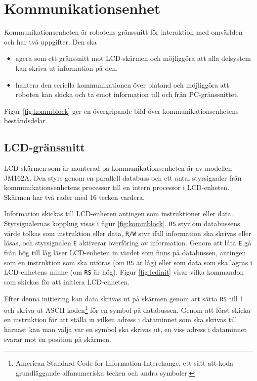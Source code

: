 \section{Kommunikationsenhet}
Kommunikationsenheten är robotens gränssnitt för interaktion med omvärlden och har två uppgifter. Den ska
\begin{itemize}
\item agera som ett gränssnitt mot LCD-skärmen och möjliggöra att alla delsystem kan skriva ut information på den.
\item hantera den seriella kommunikationen över blåtand och möjliggöra att roboten kan skicka och ta emot information till och från PC-gränssnittet.
\end{itemize}

Figur \ref{fig:kommblock} ger en övergripande bild över kommunikationsenhetens beståndsdelar.


\subsection{LCD-gränssnitt}
LCD-skärmen som är monterad på kommunikationsenheten är av modellen JM162A. Den styrs genom en parallell databuss och ett antal styrsignaler från kommunikationsenhetens processor till en intern processor i LCD-enheten. Skärmen har två rader med 16 tecken vardera. \cite{lcd}

Information skickas till LCD-enheten antingen som instruktioner eller data. Styrsignalernas koppling visas i figur \ref{fig:kommblock}. \verb|RS| styr om databussens värde tolkas som instruktion eller data, \verb|R/W| styr ifall information ska skrivas eller läsas, och styrsignalen \verb|E| aktiverar överföring av information. Genom att låta \verb|E| gå från hög till låg läser LCD-enheten in värdet som finns på databussen, antingen som en instruktion som ska utföras (om \verb|RS| är låg) eller som data som ska lagras i LCD-enhetens minne (om \verb|RS| är hög). Figur \ref{fig:lcdinit} visar vilka kommandon som skickas för att initiera LCD-enheten.


Efter denna initiering kan data skrivas ut på skärmen genom att sätta \verb|RS| till 1 och skriva ut ASCII-koden\footnote{American Standard Code for Information Interchange, ett sätt att koda grundläggande alfanumeriska tecken och andra symboler.} för en symbol på databussen. Genom att först skicka en instruktion för att ställa in vilken adress i dataminnet som ska skrivas till härnäst kan man välja var en symbol ska skrivas ut, en viss adress i dataminnet svarar mot en position på skärmen.

